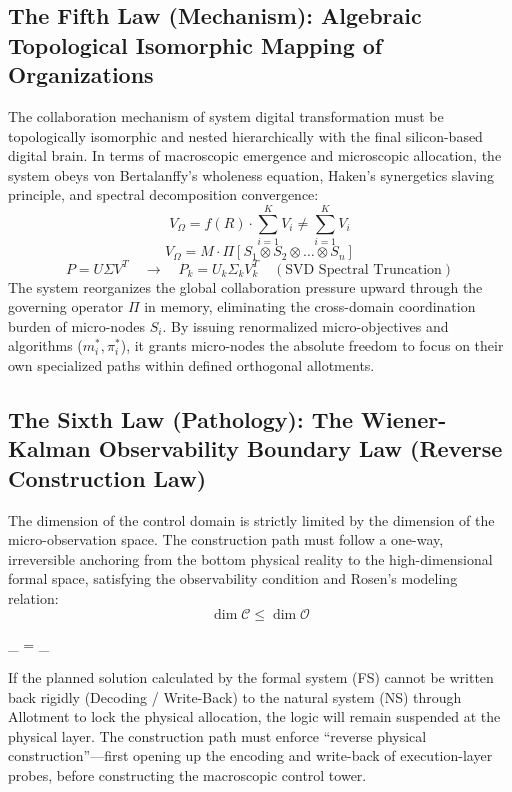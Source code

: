 \documentclass{article}
\begin{document}
\subsection*{The Fifth Law (Mechanism): Algebraic Topological Isomorphic Mapping of Organizations}
The collaboration mechanism of system digital transformation must be topologically isomorphic and nested hierarchically with the final silicon-based digital brain. In terms of macroscopic emergence and microscopic allocation, the system obeys von Bertalanffy's wholeness equation, Haken's synergetics slaving principle, and spectral decomposition convergence:
\begin{equation}
    V_{\Omega} = f(R) \cdot \sum_{i=1}^{K} V_i \neq \sum_{i=1}^{K} V_i
\end{equation}
\begin{equation}
    V_{\Omega} = M \cdot \Pi \left[ S_1 \otimes S_2 \otimes \dots \otimes S_n \right]
\end{equation}
\begin{equation}
    P = U \Sigma V^T \quad \to \quad P_k = U_k \Sigma_k V_k^T \quad (\text{SVD Spectral Truncation})
\end{equation}
The system reorganizes the global collaboration pressure upward through the governing operator $\Pi$ in memory, eliminating the cross-domain coordination burden of micro-nodes $S_i$. By issuing renormalized micro-objectives and algorithms ($m_i^*, \pi_i^*$), it grants micro-nodes the absolute freedom to focus on their own specialized paths within defined orthogonal allotments.

\subsection*{The Sixth Law (Pathology): The Wiener-Kalman Observability Boundary Law (Reverse Construction Law)}
The dimension of the control domain is strictly limited by the dimension of the micro-observation space. The construction path must follow a one-way, irreversible anchoring from the bottom physical reality to the high-dimensional formal space, satisfying the observability condition and Rosen's modeling relation:
\begin{equation}
    \dim \mathcal{C} \le \dim \mathcal{O}
\end{equation}
\begin{equation{}}
     \circ {}_{} = _{} \circ {}
\end{equation{}}
If the planned solution calculated by the formal system (FS) cannot be written back rigidly (Decoding / Write-Back) to the natural system (NS) through Allotment to lock the physical allocation, the logic will remain suspended at the physical layer. The construction path must enforce ``reverse physical construction''---first opening up the encoding and write-back of execution-layer probes, before constructing the macroscopic control tower.
\end{document}
